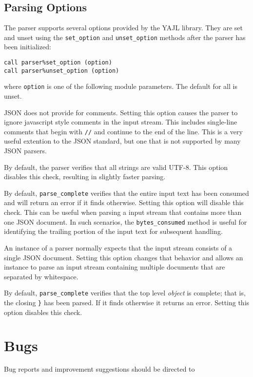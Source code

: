 \documentclass[11pt]{article}
\begin{document}
\subsection{Parsing Options}
The parser supports several options provided by the YAJL library.
They are set and unset using the \texttt{set_option} and
\texttt{unset_option} methods after the parser has been initialized:
\begin{verbatim}
call parser%set_option (option)
call parser%unset_option (option)
\end{verbatim}
where \texttt{option} is one of the following module parameters.  The
default for all is unset.
\begin{description}[style=nextline]\setlength{\itemsep}{0pt}
\item[FYAJL_ALLOW_COMMENTS]
  JSON does not provide for comments.  Setting this option causes the
  parser to ignore java\-script style comments in the input stream.  This
  includes single-line comments that begin with \texttt{//} and continue
  to the end of the line.  This is a very useful extention to the JSON
  standard, but one that is not supported by many JSON parsers.
\item[FYAJL_DONT_VALIDATE_STRINGS]
  By default, the parser verifies that all strings are valid UTF-8.  This
  option disables this check, resulting in slightly faster parsing.
\item[FYAJL_ALLOW_TRAILING_GARBAGE]
  By default, \texttt{parse_complete} verifies that the entire input text has
  been consumed and will return an error if it finds otherwise.  Setting this
  option will disable this check.  This can be useful when parsing a input
  stream that contains more than one JSON document.  In such scenarios, the
  \texttt{bytes_consumed} method is useful for identifying the trailing
  portion of the input text for subsequent handling.
\item[FYAJL_ALLOW_MULTIPLE_DOCUMENTS]
  An instance of a parser normally expects that the input stream consists
  of a single JSON document.  Setting this option changes that behavior and
  allows an instance to parse an input stream containing multiple documents
  that are separated by whitespace.
\item[FYAJL_ALLOW_PARTIAL_DOCUMENT]
  By default, \texttt{parse_complete} verifies that the top level \emph{object}
  is complete; that is, the closing \texttt{\}} has been parsed.  If it finds
  otherwise it returns an error.  Setting this option disables this check.
\end{description}

\section{Bugs}
Bug reports and improvement suggestions should be directed to

\LatexManEnd
\end{document}
